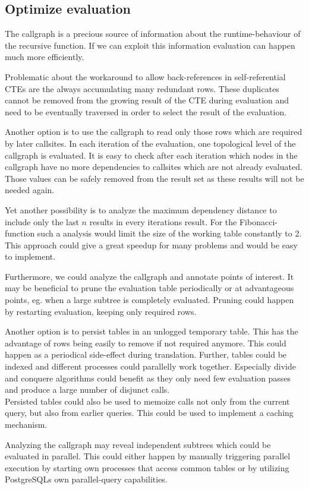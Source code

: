 \subsection{Optimize evaluation}

The callgraph is a precious source of information about the runtime-behaviour of the recursive function. If we can exploit this information evaluation can happen much more efficiently.

Problematic about the workaround to allow back-references in self-referential CTEs are the always accumulating many redundant rows. These duplicates cannot be removed from the growing result of the CTE during evaluation and need to be eventually traversed in order to select the result of the evaluation.

Another option is to use the callgraph to read only those rows which are required by later callsites. In each iteration of the evaluation, one topological level of the callgraph is evaluated. It is easy to check after each iteration which nodes in the callgraph have no more dependencies to callsites which are not already evaluated. Those values can be safely removed from the result set as these results will not be needed again.

Yet another possibility is to analyze the maximum dependency distance to include only the last $n$ results in every iterations result. For the Fibonacci-function such a analysis would limit the size of the working table constantly to 2. This approach could give a great speedup for many problems and would be easy to implement.

Furthermore, we could analyze the callgraph and annotate points of interest. It may be beneficial to prune the evaluation table periodically or at advantageous points, eg. when a large subtree is completely evaluated. Pruning could happen by restarting evaluation, keeping only required rows.

Another option is to persist tables in an unlogged temporary table. This has the advantage of rows being easily to remove if not required anymore. This could happen as a periodical side-effect during translation. Further, tables could be indexed and different processes could parallelly work together. Especially divide and conquere algorithms could benefit as they only need few evaluation passes and produce a large number of disjunct calls.\\
Persisted tables could also be used to memoize calls not only from the current query, but also from earlier queries. This could be used to implement a caching mechanism.

Analyzing the callgraph may reveal independent subtrees which could be evaluated in parallel. This could either happen by manually triggering parallel execution by starting own processes that access common tables or by utilizing PostgreSQLs own parallel-query capabilities. 